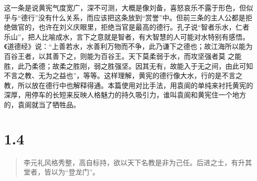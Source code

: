 \documentclass[]{book}
\begin{document}
这一条是说黄宪气度宽广，深不可测，大概是像刘备，喜怒哀乐不露于形色，但似乎与``德行''没有什么关系，而应该把这条放到``赏誉''中。但前三条的主人公都是拒绝做官的，也许在刘义庆眼里，拒绝当官是最高的德行。孔子说``智者乐水，仁者乐山''，把人比喻成水，言下之意就是智者，有大智慧的人可能对水特别有感悟。《道德经》说：``上善若水，水善利万物而不争，此乃谦下之德也；故江海所以能为百谷王者，以其善下之，则能为百谷王。天下莫柔弱于水，而攻坚强者莫
之能胜，此乃柔德；故柔之胜刚，弱之胜强坚。因其无有，故能入于无之间，由此可知不言之教、无为之益也''，等等。这样理解，黄宪的德行像大水，行的是不言之教，所以放在德行中也解释得通。本篇使用对比手法，用袁阆的单纯来衬托黄宪的深厚，用停车的长短来反映人格魅力的持久吸引力，谁叫袁阆和黄宪住一个地方的，袁阆就当了牺牲品。

\section{1.4}\label{section-3}

\begin{quote}
李元礼风格秀整，高自标持，欲以天下名教是非为己任。后进之士，有升其堂者，皆以为``登龙门''。
\end{quote}
\end{document}

